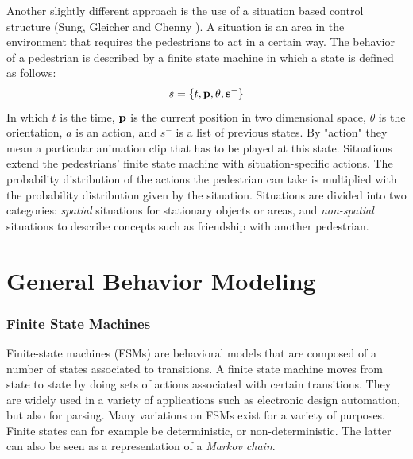 \documentclass[11pt]{book}
\begin{document}
Another slightly different approach is the use of a situation based control structure (Sung, Gleicher and Chenny \cite{Sung04scalablebehaviors}). A situation is an area in the environment that requires the pedestrians to act in a certain way. The behavior of a pedestrian is described by a finite state machine in which a state is defined as follows:
 \[s = \{t, \bf{p}, \theta, s^- \}\]
In which $t$ is the time, $\bf{p}$ is the current position in two dimensional space, $\theta$ is the orientation, $a$ is an action, and $s^-$ is a list of previous states. By "action" they mean a particular animation clip that has to be played at this state. Situations extend the pedestrians' finite state machine with situation-specific actions. The probability distribution of the actions the pedestrian can take is multiplied with the probability distribution given by the situation. Situations are divided into two categories: \emph{spatial} situations for stationary objects or areas, and \emph{non-spatial} situations to describe concepts such as friendship with another pedestrian.



\section{General Behavior Modeling}
\subsubsection{Finite State Machines}
Finite-state machines (FSMs) are behavioral models that are composed of a number of states associated to transitions. A finite state machine moves from state to state by doing sets of actions associated with certain transitions. They are widely used in a variety of applications such as electronic design automation, but also for parsing. Many variations on FSMs exist for a variety of purposes. Finite states can for example be deterministic, or non-deterministic. The latter can also be seen as a representation of a \emph{Markov chain}.
\end{document}
